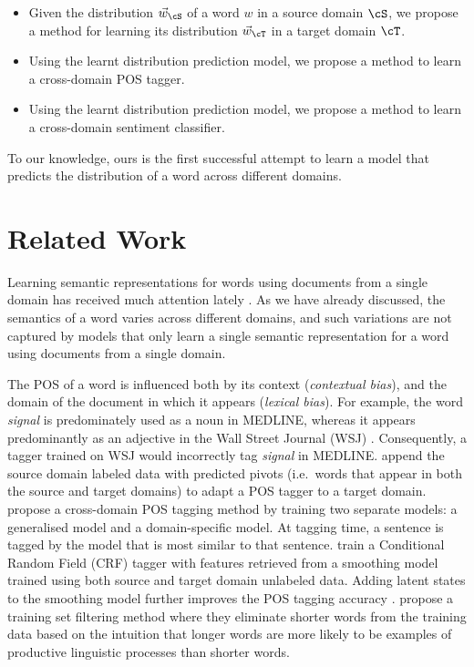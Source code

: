 \documentclass[11pt]{article}
\begin{document}
\begin{itemize}
\itemsep=0pt
\item Given the distribution $\vec{w}_{\cS}$ of a word $w$ in a source domain $\cS$, we propose a method for learning
its distribution $\vec{w}_{\cT}$ in a target domain $\cT$.
\item Using the learnt distribution prediction model, we propose a method to learn a cross-domain POS tagger.
\item Using the learnt distribution prediction model, we propose a method to learn a cross-domain sentiment classifier. 
\end{itemize}
To our knowledge, ours is the first successful attempt to learn a model that predicts the distribution of a word
across different domains.

\section{Related Work}
\label{sec:related}

Learning semantic representations for words using documents from a single domain has received much attention 
lately \cite{Vincent:2010,socher-EtAl:2013:EMNLP,Baroni:DM}.
As we have already discussed, the semantics of a word varies across different domains, and
such variations are not captured by models that only learn a single semantic representation for
a word using documents from a single domain.

The POS of a word is influenced both by its context (\textit{contextual bias}), and 
the domain of the document in which it appears (\textit{lexical bias}). For example, the word \textit{signal} is
predominately used as a noun in MEDLINE, whereas it appears predominantly as an adjective in the Wall Street Journal (WSJ) \cite{Blitzer:EMNLP:2006}.
Consequently, a tagger trained on WSJ would incorrectly tag \textit{signal} in MEDLINE.
 append the source domain labeled data with predicted pivots (i.e.\ words that
appear in both the source and target domains) 
to adapt a POS tagger to a target domain.
 propose a cross-domain POS tagging method by training two separate models:
a generalised model and a domain-specific model. At tagging time, a sentence is tagged by the model
that is most similar to that sentence. 
 train a Conditional Random Field (CRF) tagger with features retrieved from
a smoothing model trained using both source and target domain unlabeled data.
Adding latent states to the smoothing model further improves the POS tagging accuracy \cite{Huang:EMNLP:2012}.
 propose a training set filtering method where they eliminate
shorter words from the training data based on the intuition that 
longer words are more likely to be examples of productive linguistic processes than shorter words.
\end{document}
